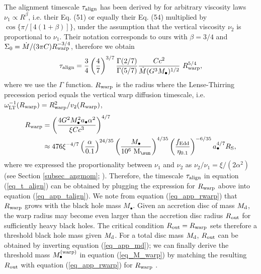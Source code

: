 \documentclass[a4paper,fleqn,usenatbib]{mnras}
\begin{document}
The alignment timescale $\tau_{\rm align}$ has been derived by \citet{martin+07} for arbitrary viscosity laws $\nu_{1} \propto R^{\beta}$, i.e. their Eq. (51) or equally their Eq. (54) multiplied by $\cos\{\pi/[4(1+\beta)]\}$, under the assumption that the vertical viscosity $\nu_{2}$ is proportional to $\nu_{1}$.
Their notation corresponds to ours with $\beta=3/4$ and $\Sigma_0 = \dot{M}/(3 \pi C) R_{\rm warp}^{-3/4}$, therefore we obtain
\begin{equation} \label{eq_app_talign}
\tau_{\rm align} = \frac{3}{4} \left( \frac{4}{7} \right)^{3/7} \frac{\Gamma(2/7)}{\Gamma(5/7)} \frac{C c^2}{\dot{M} (G^3 M_{\bullet})^{1/2}}~R_{\rm warp}^{5/4},
\end{equation}
where we use the $\Gamma$ function.
$R_{\rm warp}$ is the radius where the Lense-Thirring precession period equals the vertical warp diffusion timescale, i.e. $\omega_{\rm LT}^{-1}(R_{\rm warp}) = R_{\rm warp}^2/v_{2}(R_{\rm warp})$,
\begin{equation} \label{eq_app_rwarp}
\begin{aligned}
R_{\rm warp} & = \left( \frac{4 G^2 M_{\bullet}^2 a_{\bullet} \alpha^{2}}{\xi C c^3} \right)^{4/7} \\
& \approx 476 \xi^{-4/7} \left( \frac{\alpha}{0.1} \right)^{24/35}  \left( \frac{M_{\bullet}}{10^6~{\rm M}_{\sun}} \right)^{4/35} \left( \frac{f_{\rm Edd}}{\eta_{0.1}} \right)^{-6/35} a_{\bullet}^{4/7}
R_{\rm S},
\end{aligned}
\end{equation}
where we expressed the proportionality between $\nu_1$ and $\nu_2$ as $\nu_2 / \nu_1 = \xi/(2 \alpha^2)$ (see Section \ref{subsec_angmom}; \citealt{papaloizou+83,lodato+07}).
Therefore, the timescale $\tau_{\rm align}$ in equation (\ref{eq_t_align}) can be obtained by plugging the expression for $R_{\rm warp}$ above into equation (\ref{eq_app_talign}).
We note from equation (\ref{eq_app_rwarp}) that $R_{\rm warp}$ grows with the black hole mass $M_{\bullet}$.
Given an accretion disc of mass $M_{\rm d}$, the warp radius may become even larger than the accretion disc radius $R_{\rm out}$ for sufficiently heavy black holes.
The critical condition $R_{\rm out} = R_{\rm warp}$ sets therefore a threshold black hole mass given $M_{\rm d}$.
For a total disc mass $M_{\rm d}$, $R_{\rm out}$ can be obtained by inverting equation (\ref{eq_app_md}); we can finally derive the threshold mass $M_{\bullet}^{\rm (warp)}$ in equation (\ref{eq_M_warp}) by matching the resulting $R_{\rm out}$ with equation (\ref{eq_app_rwarp}) for $R_{\rm warp}$ \citep{dotti+13}.
\end{document}
